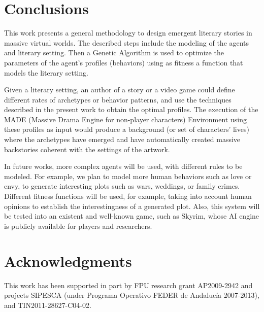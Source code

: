 \documentclass[letterpaper]{article}
\begin{document}
\section{Conclusions}
\label{sec:conclusion}



This work presents a general methodology to design emergent literary stories in massive virtual worlds. The described steps include the modeling of the agents and literary setting. Then a Genetic Algorithm is used to optimize the parameters of the agent's profiles (behaviors) using
as fitness a function that models the literary setting. 

Given a literary setting, an author of a story or a video game could define 
different rates of archetypes or behavior patterns, and use the techniques described in
the present work to obtain the optimal profiles. The execution of the MADE (Massive Drama Engine for non-player characters) Environment
using these profiles as input would produce a background (or set of characters' lives)
where the archetypes have emerged and have automatically created massive backstories coherent
with the settings of the artwork.

In future works, more complex agents will be used, with different rules to be modeled. For example, we plan to model more human behaviors such as love or envy, to generate interesting plots such as wars, weddings, or family crimes. Different fitness functions will be used, for example, taking into account human opinions to establish the interestingness of a generated plot. Also, this system will be tested into an existent and well-known game, such as Skyrim\texttrademark, whose AI engine is publicly available for players and researchers.


\section{Acknowledgments}

This work has been supported in part by FPU research grant AP2009-2942 and projects SIPESCA (under Programa Operativo FEDER de Andalucía 2007-2013), and TIN2011-28627-C04-02.
\footnotesize


\end{document}
